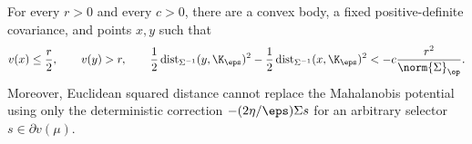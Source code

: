 \begin{proposition}
    \label{prop:ctr-distance-excursion-failure}
    For every $r>0$ and every $c>0$, there are a convex body, a fixed
    positive-definite covariance, and points $x,y$ such that
    \begin{align}
        v(x)\leq\frac r2,
        \qquad
        v(y)>r,
        \qquad
        \frac12\operatorname{dist}_{\Sigma^{-1}}(y,\K_\eps)^2
        -\frac12\operatorname{dist}_{\Sigma^{-1}}(x,\K_\eps)^2
        <-c\frac{r^2}{\norm{\Sigma}_{\op}}.
        \label{eq:ctr-distance-excursion-counterexample}
    \end{align}
    Moreover, Euclidean squared distance cannot replace the Mahalanobis
    potential using only the deterministic correction $-(2\eta/\eps)\Sigma s$
    for an arbitrary selector $s\in\partial v(\mu)$.
\end{proposition}


